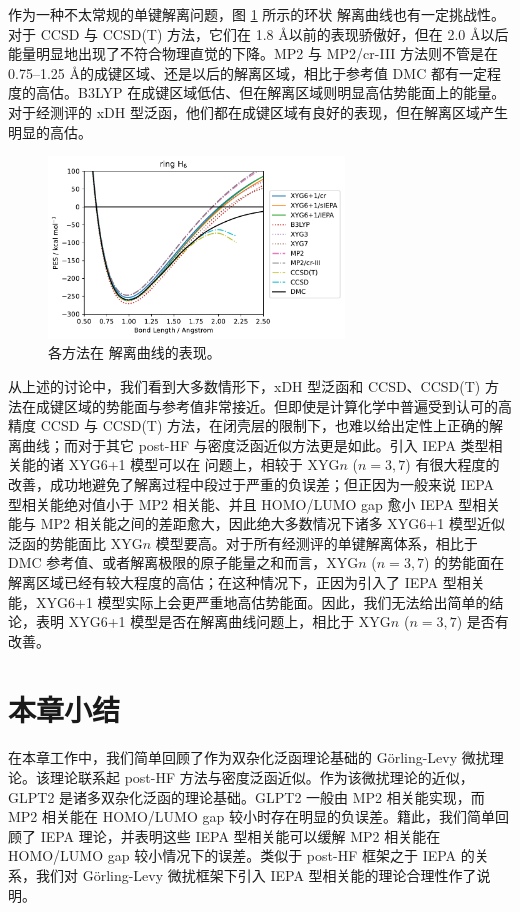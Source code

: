 作为一种不太常规的单键解离问题，图 \ref{fig.2.curve-H6} 所示的环状  解离曲线也有一定挑战性。对于 CCSD 与 CCSD(T) 方法，它们在 1.8 \AA 以前的表现骄傲好，但在 2.0 \AA 以后能量明显地出现了不符合物理直觉的下降。MP2 与 MP2/cr-III 方法则不管是在 0.75--1.25 \AA 的成键区域、还是以后的解离区域，相比于参考值 DMC 都有一定程度的高估。B3LYP 在成键区域低估、但在解离区域则明显高估势能面上的能量。对于经测评的 xDH 型泛函，他们都在成键区域有良好的表现，但在解离区域产生明显的高估。

\begin{figure}[h]
  \centering
  \includegraphics[width=0.7\textwidth]{assets/curve-H6.pdf}
  \caption{各方法在  解离曲线的表现。}
  \label{fig.2.curve-H6}
\end{figure}

从上述的讨论中，我们看到大多数情形下，xDH 型泛函和 CCSD、CCSD(T) 方法在成键区域的势能面与参考值非常接近。但即使是计算化学中普遍受到认可的高精度 CCSD 与 CCSD(T) 方法，在闭壳层的限制下，也难以给出定性上正确的解离曲线；而对于其它 post-HF 与密度泛函近似方法更是如此。引入 IEPA 类型相关能的诸 XYG6+1 模型可以在  问题上，相较于 XYG$n$ ($n=3,7$) 有很大程度的改善，成功地避免了解离过程中段过于严重的负误差；但正因为一般来说 IEPA 型相关能绝对值小于 MP2 相关能、并且 HOMO/LUMO gap 愈小 IEPA 型相关能与 MP2 相关能之间的差距愈大，因此绝大多数情况下诸多 XYG6+1 模型近似泛函的势能面比 XYG$n$ 模型要高。对于所有经测评的单键解离体系，相比于 DMC 参考值、或者解离极限的原子能量之和而言，XYG$n$ ($n=3,7$) 的势能面在解离区域已经有较大程度的高估；在这种情况下，正因为引入了 IEPA 型相关能，XYG6+1 模型实际上会更严重地高估势能面。因此，我们无法给出简单的结论，表明 XYG6+1 模型是否在解离曲线问题上，相比于 XYG$n$ ($n=3,7$) 是否有改善。

\section{本章小结}

在本章工作中，我们简单回顾了作为双杂化泛函理论基础的 G\"orling-Levy 微扰理论。该理论联系起 post-HF 方法与密度泛函近似。作为该微扰理论的近似，GLPT2 是诸多双杂化泛函的理论基础。GLPT2 一般由 MP2 相关能实现，而 MP2 相关能在 HOMO/LUMO gap 较小时存在明显的负误差。籍此，我们简单回顾了 IEPA 理论，并表明这些 IEPA 型相关能可以缓解 MP2 相关能在 HOMO/LUMO gap 较小情况下的误差。类似于 post-HF 框架之于 IEPA 的关系，我们对 G\"orling-Levy 微扰框架下引入 IEPA 型相关能的理论合理性作了说明。


